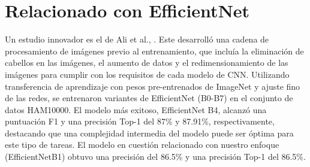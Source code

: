 

\section {Relacionado con EfficientNet}

Un estudio innovador es el de Ali et al., . Este desarrolló una cadena de procesamiento de imágenes previo al entrenamiento, que incluía la eliminación de cabellos en las imágenes, el aumento de datos y el redimensionamiento de las imágenes para cumplir con los requisitos de cada modelo de CNN. Utilizando transferencia de aprendizaje con pesos pre-entrenados de ImageNet y ajuste fino de las redes, se entrenaron variantes de EfficientNet (B0-B7) en el conjunto de datos HAM10000. El modelo más exitoso, EfficientNet B4, alcanzó una puntuación F1 y una precisión Top-1 del 87\% y 87.91\%, respectivamente, destacando que una complejidad intermedia del modelo puede ser óptima para este tipo de tareas. El modelo en cuestión relacionado con nuestro enfoque (EfficientNetB1) obtuvo una precisión del 86.5\% y una precisión Top-1 del 86.5\%.

